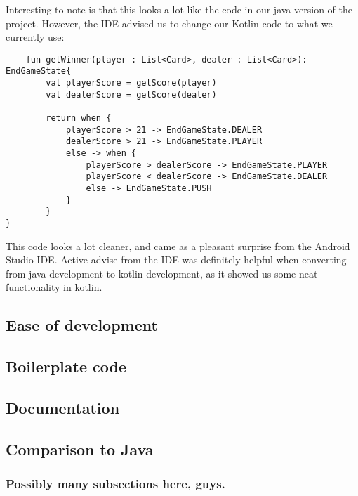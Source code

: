 Interesting to note is that this looks a lot like the code in our java-version of the project. However, the IDE advised us to change our Kotlin code to what we currently use:
\begin{lstlisting}
    fun getWinner(player : List<Card>, dealer : List<Card>): EndGameState{
        val playerScore = getScore(player)
        val dealerScore = getScore(dealer)
        
        return when {
            playerScore > 21 -> EndGameState.DEALER
            dealerScore > 21 -> EndGameState.PLAYER
            else -> when {
                playerScore > dealerScore -> EndGameState.PLAYER
                playerScore < dealerScore -> EndGameState.DEALER
                else -> EndGameState.PUSH
            }
        }
}
\end{lstlisting}
This code looks a lot cleaner, and came as a pleasant surprise from the Android Studio IDE. Active advise from the IDE was definitely helpful when converting from java-development to kotlin-development, as it showed us some neat functionality in kotlin.
\subsection{Ease of development}

\subsection{Boilerplate code}

\subsection{Documentation}

\subsection{Comparison to Java}
\subsubsection{Possibly many subsections here, guys.}
